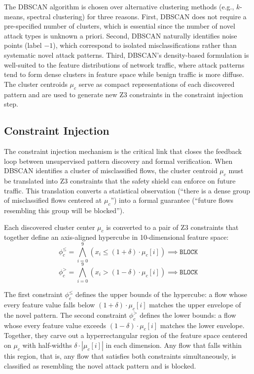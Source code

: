 \documentclass[12pt, letterpaper, oneside]{report}
\begin{document}
\noindent The DBSCAN algorithm is chosen over alternative clustering methods (e.g., $k$-means, spectral clustering) for three reasons. First, DBSCAN does not require a pre-specified number of clusters, which is essential since the number of novel attack types is unknown a priori. Second, DBSCAN naturally identifies noise points (label $-1$), which correspond to isolated misclassifications rather than systematic novel attack patterns. Third, DBSCAN's density-based formulation is well-suited to the feature distributions of network traffic, where attack patterns tend to form dense clusters in feature space while benign traffic is more diffuse. The cluster centroids $\mu_c$ serve as compact representations of each discovered pattern and are used to generate new Z3 constraints in the constraint injection step.

\subsection{Constraint Injection}

The constraint injection mechanism is the critical link that closes the feedback loop between unsupervised pattern discovery and formal verification. When DBSCAN identifies a cluster of misclassified flows, the cluster centroid $\mu_c$ must be translated into Z3 constraints that the safety shield can enforce on future traffic. This translation converts a statistical observation (``there is a dense group of misclassified flows centered at $\mu_c$'') into a formal guarantee (``future flows resembling this group will be blocked'').

Each discovered cluster center $\mu_c$ is converted to a pair of Z3 constraints that together define an axis-aligned hypercube in 10-dimensional feature space:
\begin{equation}
\label{eq:constraint_injection}
\phi_c^{\leq} = \bigwedge_{i=0}^{9} (x_i \leq (1+\delta) \cdot \mu_c[i]) \implies \texttt{BLOCK}
\end{equation}
\begin{equation}
\phi_c^{>} = \bigwedge_{i=0}^{9} (x_i > (1-\delta) \cdot \mu_c[i]) \implies \texttt{BLOCK}
\end{equation}

The first constraint $\phi_c^{\leq}$ defines the upper bounds of the hypercube: a flow whose every feature value falls below $(1+\delta) \cdot \mu_c[i]$ matches the upper envelope of the novel pattern. The second constraint $\phi_c^{>}$ defines the lower bounds: a flow whose every feature value exceeds $(1-\delta) \cdot \mu_c[i]$ matches the lower envelope. Together, they carve out a hyperrectangular region of the feature space centered on $\mu_c$ with half-widths $\delta \cdot |\mu_c[i]|$ in each dimension. Any flow that falls within this region, that is, any flow that satisfies both constraints simultaneously, is classified as resembling the novel attack pattern and is blocked.
\end{document}
